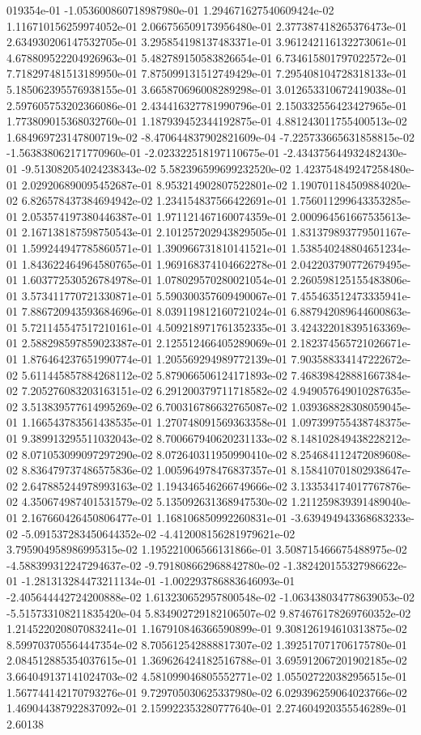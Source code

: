 019354e-01	-1.053600860718987980e-01	1.294671627540609424e-02	1.116710156259974052e-01	2.066756509173956480e-01	2.377387418265376473e-01	2.634930206147532705e-01	3.295854198137483371e-01	3.961242116132273061e-01	4.678809522204926963e-01	5.482789150583826654e-01	6.734615801797022572e-01	7.718297481513189950e-01	7.875099131512749429e-01	7.295408104728318133e-01	5.185062395576938155e-01	3.665870696008289298e-01	3.012653310672419038e-01	2.597605753202366086e-01	2.434416327781990796e-01	2.150332556423427965e-01	1.773809015368032760e-01	1.187939452344192875e-01	4.881243011755400513e-02	1.684969723147800719e-02	-8.470644837902821609e-04	-7.225733665631858815e-02	-1.563838062171770960e-01	-2.023322518197110675e-01	-2.434375644932482430e-01	-9.513082054024238343e-02	5.582396599699232520e-02	1.423754849247258480e-01	2.029206890095452687e-01	8.953214902807522801e-02	1.190701184509884020e-02	6.826578437384694942e-02	1.234154837566422691e-01	1.756011299643353285e-01	2.053574197380446387e-01	1.971121467160074359e-01	2.000964561667535613e-01	2.167138187598750543e-01	2.101257202943829505e-01	1.831379893779501167e-01	1.599244947785860571e-01	1.390966731810141521e-01	1.538540248804651234e-01	1.843622464964580765e-01	1.969168374104662278e-01	2.042203790772679495e-01	1.603772530526784978e-01	1.078029570280021054e-01	2.260598125155483806e-01	3.573411770721330871e-01	5.590300357609490067e-01	7.455463512473335941e-01	7.886720943593684696e-01	8.039119812160721024e-01	6.887942089644600863e-01	5.721145547517210161e-01	4.509218971761352335e-01	3.424322018395163369e-01	2.588298597859023387e-01	2.125512466405289069e-01	2.182374565721026671e-01	1.876464237651990774e-01	1.205569294989772139e-01	7.903588334147222672e-02	5.611445857884268112e-02	5.879066506124171893e-02	7.468398428881667384e-02	7.205276083203163151e-02	6.291200379711718582e-02	4.949057649010287635e-02	3.513839577614995269e-02	6.700316786632765087e-02	1.039368828308059045e-01	1.166543783561438535e-01	1.270748091569363358e-01	1.097399755438748375e-01	9.389913295511032043e-02	8.700667940620231133e-02	8.148102849438228212e-02	8.071053099097297290e-02	8.072640311950990410e-02	8.254684112472089608e-02	8.836479737486575836e-02	1.005964978476837357e-01	8.158410701802938647e-02	2.647885244978993163e-02	1.194346546266749666e-02	3.133534174017767876e-02	4.350674987401531579e-02	5.135092631368947530e-02	1.211259839391489040e-01	2.167660426450806477e-01	1.168106850992260831e-01	-3.639494943368683233e-02	-5.091537283450644352e-02	-4.412008156281979621e-02	3.795904958986995315e-02	1.195221006566131866e-01	3.508715466675488975e-02	-4.588399312247294637e-02	-9.791808662968842780e-02	-1.382420155327986622e-01	-1.281313284473211134e-01	-1.002293786883646093e-01	-2.405644442724200888e-02	1.613230652957800548e-02	-1.063438034778639053e-02	-5.515733108211835420e-04	5.834902729182106507e-02	9.874676178269760352e-02	1.214522020807083241e-01	1.167910846366590899e-01	9.308126194610313875e-02	8.599703705564447354e-02	8.705612542888817307e-02	1.392517071706175780e-01	2.084512885354037615e-01	1.369626424182516788e-01	3.695912067201902185e-02	3.664049137141024703e-02	4.581099046805552771e-02	1.055027220382956515e-01	1.567744142170793276e-01	9.729705030625337980e-02	6.029396259064023766e-02	1.469044387922837092e-01	2.159922353280777640e-01	2.274604920355546289e-01	2.60138
